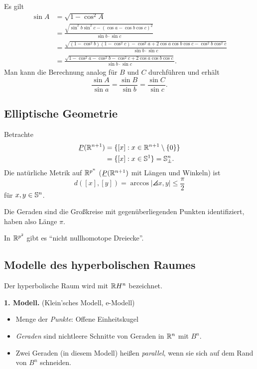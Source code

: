 Es gilt
\[ \begin{aligned}
    \sin A &= \sqrt{1-\cos^2 A} \\
    &= \frac{\sqrt{\sin^2 b \sin^2 c - (\cos a - \cos b \cos c)^2}}{\sin b \cdot
      \sin c} \\
    &= \frac{\sqrt{(1-\cos^2 b)(1-\cos^2 c) - \cos^2 a + 2 \cos a \cos b \cos c
        - \cos^2 b \cos^2 c}}{\sin b \cdot \sin c} \\
    &= \frac{\sqrt{1 - \cos^2 a - \cos^2 b - \cos^2 c + 2 \cos a \cos b \cos
        c}}{\sin b \cdot \sin c}.
  \end{aligned} \]
Man kann die Berechnung analog für $B$ und $C$ durchführen und erhält
\[ \frac{\sin A}{\sin a} = \frac{\sin B}{\sin b} = \frac{\sin C}{\sin c}. \]

\subsection{Elliptische Geometrie}
Betrachte
\[ \begin{aligned}
    \proj(\real^{n+1}) &= \{ [x] : x \in \real^{n+1} \setminus \{0\}\} \\
    &= \{ [x] : x \in \sphere^1 \} = \sphere^n_\pm.
  \end{aligned} \]
Die natürliche Metrik auf $\mathbb{R}^{p^n}$ ($\proj(\real^{n+1})$ mit Längen und
Winkeln) ist
\[ d( [x], [y] ) = \arccos | \angles{x,y} | \le \frac{\pi}{2} \]
für $x, y \in \mathbb{S}^n$.

Die Geraden sind die Großkreise mit gegenüberliegenden Punkten identifiziert,
haben also Länge $\pi$.

In $\mathbb{R}^{p^2}$ gibt es ``nicht nullhomotope Dreiecke''.

\subsection{Modelle des hyperbolischen Raumes}
Der hyperbolische Raum wird mit $\mathbb{R} H^n$ bezeichnet.

\textbf{1. Modell.} (Klein'sches Modell, e-Modell)
\begin{itemize}
  \item Menge der \emph{Punkte}: Offene Einheitskugel
  \item \emph{Geraden} sind nichtleere Schnitte von Geraden in $\mathbb{R}^n$ mit $B^n$.
  \item Zwei Geraden (in diesem Modell) heißen \emph{parallel}, wenn sie sich
    auf dem Rand von $B^n$ schneiden.
\end{itemize}

